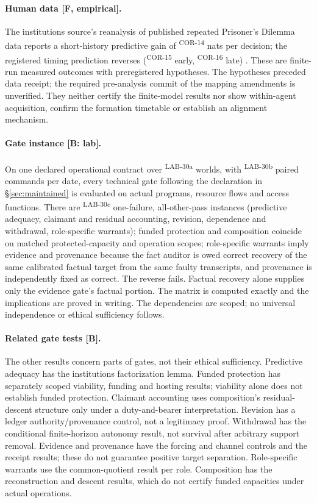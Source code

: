 \documentclass[pdflatex,sn-basic]{sn-jnl}%
\newcommand{\rec}[1]{\ifannotated\textsuperscript{\textcolor{blue!60!black}{\tiny#1}}\fi}
\begin{document}
\begin{appendices}
\paragraph{Human data [F, empirical].} The institutions source's reanalysis of published repeated Prisoner's Dilemma data reports a short-history predictive gain of \numInstHumanGain\rec{COR-14} nats per decision; the registered timing prediction reverses (\numInstEarlyGain\rec{COR-15} early, \numInstLateGain\rec{COR-16} late) \citep{tsiokos2026institutions}. These are finite-run measured outcomes with preregistered hypotheses. The hypotheses preceded data receipt; the required pre-analysis commit of the mapping amendments is unverified. They neither certify the finite-model results nor show within-agent acquisition, confirm the formation timetable or establish an alignment mechanism.

\paragraph{Gate instance [B: lab].} On one declared operational contract over \numCOneWorlds\rec{LAB-30a} worlds, with \numCOneCommands\rec{LAB-30b} paired commands per date, every technical gate following the declaration in \S\ref{sec:maintained} is evaluated on actual programs, resource flows and access functions. There are \numCOneIsolatedFailures\rec{LAB-30c} one-failure, all-other-pass instances (predictive adequacy, claimant and residual accounting, revision, dependence and withdrawal, role-specific warrants); funded protection and composition coincide on matched protected-capacity and operation scopes; role-specific warrants imply evidence and provenance because the fact auditor is owed correct recovery of the same calibrated factual target from the same faulty transcripts, and provenance is independently fixed as correct. The reverse fails. Factual recovery alone supplies only the evidence gate's factual portion. The matrix is computed exactly and the implications are proved in writing. The dependencies are scoped; no universal independence or ethical sufficiency follows.

\paragraph{Related gate tests [B].} The other results concern parts of gates, not their ethical sufficiency. Predictive adequacy has the institutions factorization lemma. Funded protection has separately scoped viability, funding and hosting results; viability alone does not establish funded protection. Claimant accounting uses composition's residual-descent structure only under a duty-and-bearer interpretation. Revision has a ledger authority/provenance control, not a legitimacy proof. Withdrawal has the conditional finite-horizon autonomy result, not survival after arbitrary support removal. Evidence and provenance have the forcing and channel controls and the receipt results; these do not guarantee positive target separation. Role-specific warrants use the common-quotient result per role. Composition has the reconstruction and descent results, which do not certify funded capacities under actual operations.


\end{appendices}
\end{document}

